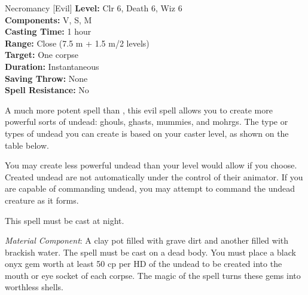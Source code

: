 {Necromancy [Evil]}
{
	\textbf{Level:}
	Clr 6, Death 6, Wiz 6\\
	\textbf{Components:}
	V, S, M\\
	\textbf{Casting Time:}
	1 hour\\
	\textbf{Range:}
	Close (7.5 m + 1.5 m/2 levels)\\
	\textbf{Target:}
	One corpse\\
	\textbf{Duration:}
	Instantaneous\\
	\textbf{Saving Throw:}
	None\\
	\textbf{Spell Resistance:}
	No\\
}
{
	A much more potent spell than , this evil spell allows you to create more powerful sorts of undead: ghouls, ghasts, mummies, and mohrgs. The type or types of undead you can create is based on your caster level, as shown on the table below.


	You may create less powerful undead than your level would allow if you choose. Created undead are not automatically under the control of their animator. If you are capable of commanding undead, you may attempt to command the undead creature as it forms.

	This spell must be cast at night.

	\textit{Material Component}:
	A clay pot filled with grave dirt and another filled with brackish water. The spell must be cast on a dead body. You must place a black onyx gem worth at least 50 cp per HD of the undead to be created into the mouth or eye socket of each corpse. The magic of the spell turns these gems into worthless shells.

}
